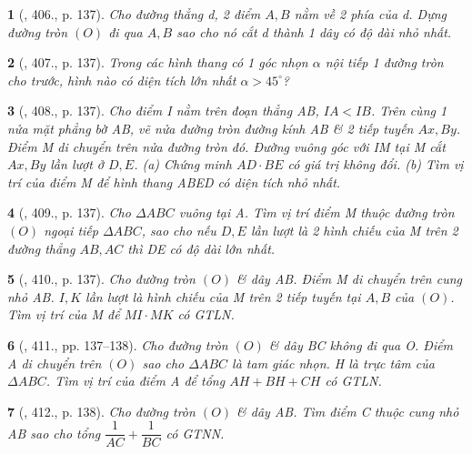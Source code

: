 \documentclass{article}
\newtheorem{baitoan}{}
\begin{document}
\begin{baitoan}[\cite{Binh_Toan_9_tap_2}, 406., p. 137]
	Cho đường thẳng d, 2 điểm $A,B$ nằm về 2 phía của d. Dựng đường tròn $(O)$ đi qua $A,B$ sao cho nó cắt d thành 1 dây có độ dài nhỏ nhất.
\end{baitoan}

\begin{baitoan}[\cite{Binh_Toan_9_tap_2}, 407., p. 137]
	Trong các hình thang có 1 góc nhọn $\alpha$ nội tiếp 1 đường tròn cho trước, hình nào có diện tích lớn nhất $\alpha > 45^\circ$?
\end{baitoan}

\begin{baitoan}[\cite{Binh_Toan_9_tap_2}, 408., p. 137]
	Cho điểm I nằm trên đoạn thẳng AB, $IA < IB$. Trên cùng 1 nửa mặt phẳng bờ AB, vẽ nửa đường tròn đường kính AB \& 2 tiếp tuyến $Ax,By$. Điểm M di chuyển trên nửa đường tròn đó. Đường vuông góc với IM tại M cắt $Ax,By$ lần lượt ở $D,E$. (a) Chứng minh $AD\cdot BE$ có giá trị không đổi. (b) Tìm vị trí của điểm M để hình thang ABED có diện tích nhỏ nhất.
\end{baitoan}

\begin{baitoan}[\cite{Binh_Toan_9_tap_2}, 409., p. 137]
	Cho $\Delta ABC$ vuông tại A. Tìm vị trí điểm M thuộc đường tròn $(O)$ ngoại tiếp $\Delta ABC$, sao cho nếu $D,E$ lần lượt là 2 hình chiếu của M trên 2 đường thẳng $AB,AC$ thì DE có độ dài lớn nhất.
\end{baitoan}

\begin{baitoan}[\cite{Binh_Toan_9_tap_2}, 410., p. 137]
	Cho đường tròn $(O)$ \& dây AB. Điểm M di chuyển trên cung nhỏ AB. $I,K$ lần lượt là hình chiếu của M trên 2 tiếp tuyến tại $A,B$ của $(O)$. Tìm vị trí của M để $MI\cdot MK$ có {\rm GTLN}.
\end{baitoan}

\begin{baitoan}[\cite{Binh_Toan_9_tap_2}, 411., pp. 137--138]
	Cho đường tròn $(O)$ \& dây BC không đi qua O. Điểm A di chuyển trên $(O)$ sao cho $\Delta ABC$ là tam giác nhọn. H là trực tâm của $\Delta ABC$. Tìm vị trí của điểm A để tổng $AH + BH + CH$ có {\rm GTLN}.
\end{baitoan}

\begin{baitoan}[\cite{Binh_Toan_9_tap_2}, 412., p. 138]
	Cho đường tròn $(O)$ \& dây AB. Tìm điểm C thuộc cung nhỏ AB sao cho tổng $\dfrac{1}{AC} + \dfrac{1}{BC}$ có {\rm GTNN}.
\end{baitoan}
\end{document}
